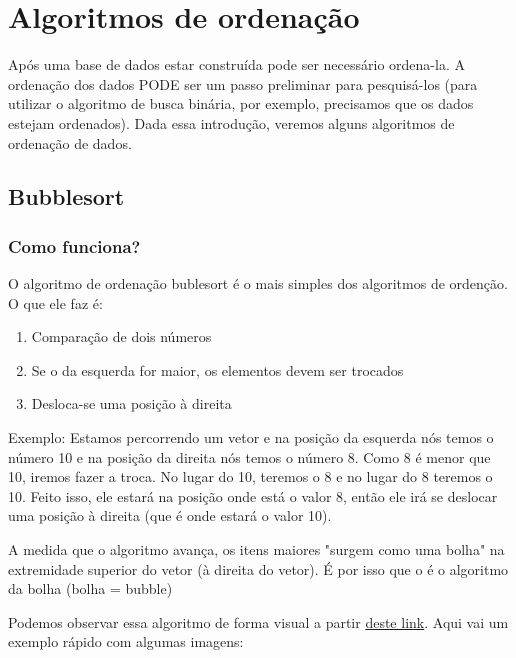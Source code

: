 \documentclass{report}
\begin{document}
	
	
	\section{Algoritmos de ordenação}
	Após uma base de dados estar construída pode ser necessário ordena-la. A ordenação dos dados PODE ser um passo preliminar para pesquisá-los (para utilizar o algoritmo de busca binária, por exemplo, precisamos que os dados estejam ordenados). Dada essa introdução, veremos alguns algoritmos de ordenação de dados.
	
	\subsection{Bubblesort}
	
	\subsubsection{Como funciona?}
	O algoritmo de ordenação bublesort  é o mais simples dos algoritmos de ordenção. O que ele faz é:
	
	\begin{enumerate}
		\item Comparação de dois números
		\item Se o da esquerda for maior, os elementos devem ser trocados
		\item Desloca-se uma posição à direita
	\end{enumerate}
	
	
	Exemplo: Estamos percorrendo um vetor e na posição da esquerda nós temos o número 10 e na posição da direita nós temos o número 8. Como 8 é menor que 10, iremos fazer a troca. No lugar do 10, teremos o 8 e no lugar do 8 teremos o 10. Feito isso, ele estará na posição onde está o valor 8, então ele irá se deslocar uma posição à direita (que é onde estará o valor 10).
	
	A medida que o algoritmo avança, os itens maiores "surgem como uma bolha" na extremidade superior do vetor (à direita do vetor). É por isso que o é o  algoritmo da bolha (bolha = bubble)
	
	Podemos observar essa algoritmo de forma visual a partir \href{ https://visualgo.net/en/sorting}{deste link}. Aqui vai um exemplo rápido com algumas imagens:
\end{document}
